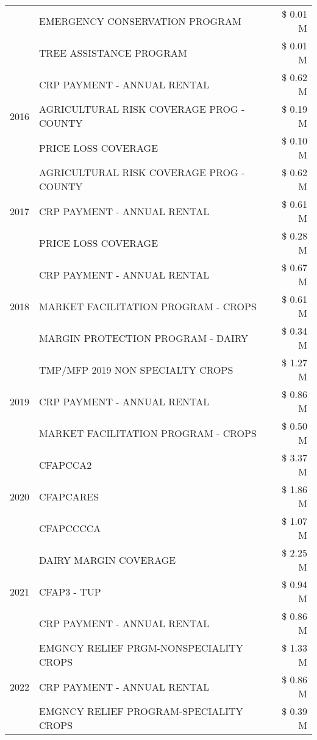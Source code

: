\begin{tabular}{llr}
 & EMERGENCY CONSERVATION PROGRAM & \$ 0.01 M \\
 & TREE ASSISTANCE PROGRAM & \$ 0.01 M \\
\cline{1-3}
\multirow[t]{3}{*}{2016} & CRP PAYMENT - ANNUAL RENTAL & \$ 0.62 M \\
 & AGRICULTURAL RISK COVERAGE PROG - COUNTY & \$ 0.19 M \\
 & PRICE LOSS COVERAGE & \$ 0.10 M \\
\cline{1-3}
\multirow[t]{3}{*}{2017} & AGRICULTURAL RISK COVERAGE PROG - COUNTY & \$ 0.62 M \\
 & CRP PAYMENT - ANNUAL RENTAL & \$ 0.61 M \\
 & PRICE LOSS COVERAGE & \$ 0.28 M \\
\cline{1-3}
\multirow[t]{3}{*}{2018} & CRP PAYMENT - ANNUAL RENTAL & \$ 0.67 M \\
 & MARKET FACILITATION PROGRAM - CROPS & \$ 0.61 M \\
 & MARGIN PROTECTION PROGRAM - DAIRY & \$ 0.34 M \\
\cline{1-3}
\multirow[t]{3}{*}{2019} & TMP/MFP 2019 NON SPECIALTY CROPS & \$ 1.27 M \\
 & CRP PAYMENT - ANNUAL RENTAL & \$ 0.86 M \\
 & MARKET FACILITATION PROGRAM - CROPS & \$ 0.50 M \\
\cline{1-3}
\multirow[t]{3}{*}{2020} & CFAPCCA2 & \$ 3.37 M \\
 & CFAPCARES & \$ 1.86 M \\
 & CFAPCCCCA & \$ 1.07 M \\
\cline{1-3}
\multirow[t]{3}{*}{2021} & DAIRY MARGIN COVERAGE & \$ 2.25 M \\
 & CFAP3 - TUP & \$ 0.94 M \\
 & CRP PAYMENT - ANNUAL RENTAL & \$ 0.86 M \\
\cline{1-3}
\multirow[t]{3}{*}{2022} & EMGNCY RELIEF PRGM-NONSPECIALITY CROPS & \$ 1.33 M \\
 & CRP PAYMENT - ANNUAL RENTAL & \$ 0.86 M \\
 & EMGNCY RELIEF PROGRAM-SPECIALITY CROPS & \$ 0.39 M \\
\cline{1-3}
\bottomrule
\end{tabular}

